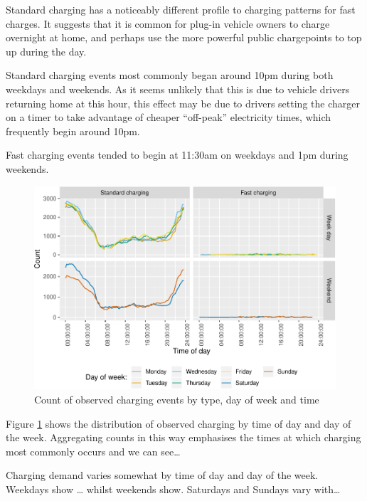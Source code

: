 \documentclass[]{article}
\begin{document}
Standard charging has a noticeably different profile to charging
patterns for fast charges. It suggests that it is common for plug-in
vehicle owners to charge overnight at home, and perhaps use the more
powerful public chargepoints to top up during the day.

Standard charging events most commonly began around 10pm during both
weekdays and weekends. As it seems unlikely that this is due to vehicle
drivers returning home at this hour, this effect may be due to drivers
setting the charger on a timer to take advantage of cheaper ``off-peak''
electricity times, which frequently begin around 10pm.

Fast charging events tended to begin at 11:30am on weekdays and 1pm
during weekends.

\begin{figure}
\centering
\includegraphics{EVBB_report_files/figure-latex/chargeTime-1.pdf}
\caption{\label{fig:chargeTime}Count of observed charging events by type,
day of week and time}
\end{figure}

Figure \ref{fig:chargeTime} shows the distribution of observed charging
by time of day and day of the week. Aggregating counts in this way
emphasises the times at which charging most commonly occurs and we can
see\ldots{}

Charging demand varies somewhat by time of day and day of the week.
Weekdays show \ldots{} whilst weekends show. Saturdays and Sundays vary
with\ldots{}
\end{document}
